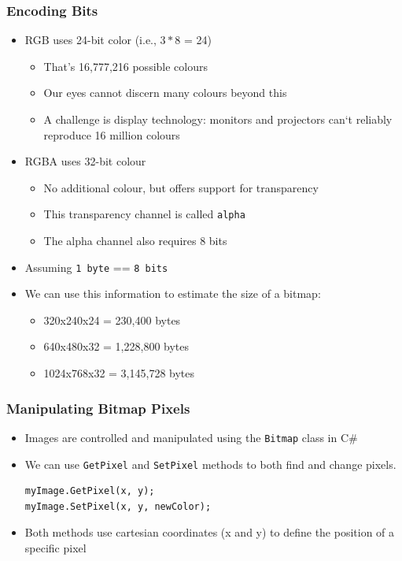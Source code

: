 \begin{frame}
	\frametitle{Encoding Bits}
	\begin{itemize}
		\item RGB uses 24-bit color (i.e., $3 * 8$ = 24)
		\begin{itemize}
			\item That's 16,777,216 possible colours
			\item Our eyes cannot discern many colours beyond this
			\item A challenge is display technology: monitors and projectors can`t reliably reproduce 16 million colours
		\end{itemize}
		\item RGBA uses 32-bit colour
		\begin{itemize}
			\item No additional colour, but offers support for transparency
			\item This transparency channel is called \texttt{alpha}
			\item The alpha channel also requires 8 bits
		\end{itemize}
		\item Assuming \texttt{1 byte} == \texttt{8 bits}
		\item We can use this information to estimate the size of a bitmap:
		\begin{itemize}
			\item 320x240x24 = 230,400 bytes
			\item 640x480x32 = 1,228,800 bytes
			\item 1024x768x32 = 3,145,728 bytes
		\end{itemize}
	\end{itemize}
\end{frame}


\begin{frame}[fragile]
	\frametitle{Manipulating Bitmap Pixels}
	
	\begin{itemize}
		\item Images are controlled and manipulated using the \texttt{Bitmap} class in C\#
		\item We can use \texttt{GetPixel} and \texttt{SetPixel} methods to both find and change pixels.
	    \begin{lstlisting}
myImage.GetPixel(x, y);
myImage.SetPixel(x, y, newColor);
	    \end{lstlisting}
	    \item Both methods use cartesian coordinates (x and y) to define the position of a specific pixel
	\end{itemize}
\end{frame}

